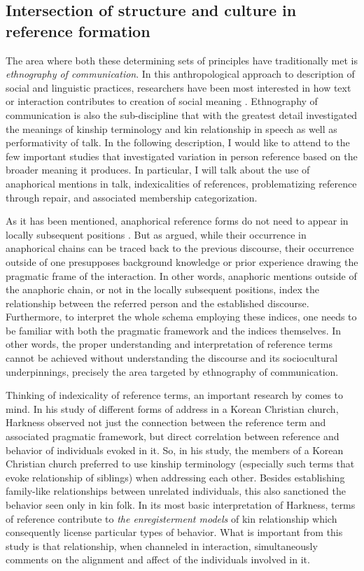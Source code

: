 \documentclass[12pt]{article}
\begin{document}
\subsection{Intersection of structure and culture in reference formation}
The area where both these determining sets of principles have traditionally met is \textit{ethnography of communication}. In this anthropological approach to description of social and linguistic practices, researchers have been most interested in how text or interaction contributes to creation of social meaning \parencite{hymes1989}. Ethnography of communication is also the sub-discipline that with the greatest detail investigated the meanings of kinship terminology and kin relationship in speech as well as performativity of talk. In the following description, I would like to attend to the few important studies that investigated variation in person reference based on the broader meaning it produces. In particular, I will talk about the use of anaphorical mentions in talk, indexicalities of references, problematizing reference through repair, and associated membership categorization. 

As it has been mentioned, anaphorical reference forms do not need to appear in locally subsequent positions \parencite{schegloff1996}. But as \textcite{hanks2007} argued, while their occurrence in anaphorical chains can be traced back to the previous discourse, their occurrence outside of one presupposes background knowledge or prior experience drawing the pragmatic frame of the interaction. In other words, anaphoric mentions outside of the anaphoric chain, or not in the locally subsequent positions, index the relationship between the referred person and the established discourse. Furthermore, to interpret the whole schema employing these indices, one needs to be familiar with both the pragmatic framework and the indices themselves. In other words, the proper understanding and interpretation of reference terms cannot be achieved without understanding the discourse and its sociocultural underpinnings, precisely the area targeted by ethnography of communication.

Thinking of indexicality of reference terms, an important research by \textcite{harkness2015} comes to mind. In his study of different forms of address in a Korean Christian church, Harkness observed not just the connection between the reference term and associated pragmatic framework, but direct correlation between reference and behavior of individuals evoked in it. So, in his study, the members of a Korean Christian church preferred to use kinship terminology (especially such terms that evoke relationship of siblings) when addressing each other. Besides establishing family-like relationships between unrelated individuals, this also sanctioned the behavior seen only in kin folk. In its most basic interpretation of Harkness, terms of reference contribute to \textit{the enregisterment models} of kin relationship which consequently license particular types of behavior. What is important from this study is that relationship, when channeled in interaction, simultaneously comments on the alignment and affect of the individuals involved in it. 
\end{document}
